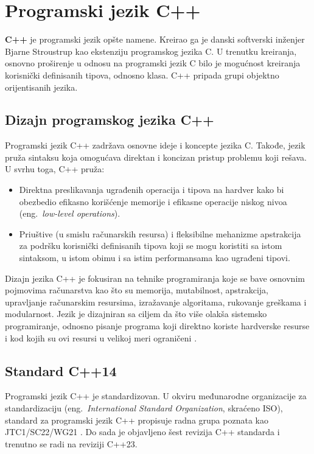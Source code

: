 \documentclass[12pt,oneside]{memoir}
\begin{document}
\section{Programski jezik C++}

\textbf{C++} je programski jezik op\v{s}te namene. Kreirao ga je danski softverski in\v{z}enjer Bjarne Stroustrup kao ekstenziju programskog jezika C. U trenutku kreiranja, osnovno pro\v{s}irenje u odnosu na programski jezik C bilo je mogu\'{c}nost kreiranja korisni\v{c}ki definisanih tipova, odnosno klasa. C++ pripada grupi objektno orijentisanih jezika. 

\subsection{Dizajn programskog jezika C++}

Programski jezik C++ zadr\v{z}ava osnovne ideje i koncepte jezika C. Takođe, jezik pru\v{z}a sintaksu koja omogu\'{c}ava direktan i koncizan pristup problemu koji re\v{s}ava.
U svrhu toga, C++ pru\v{z}a:
\begin{itemize}
  \item {Direktna preslikavanja ugrađenih operacija i tipova na hardver kako bi obezbedio efikasno kori\v{s}\'{c}enje memorije i efikasne operacije niskog nivoa (eng.~\textit{low-level operations}).}
  \item {Priu\v{s}tive (u smislu ra\v{c}unarskih resursa) i fleksibilne mehanizme apstrakcija za podr\v{s}ku korisni\v{c}ki definisanih tipova koji se mogu koristiti sa istom sintaksom, u istom obimu i sa istim performansama kao ugrađeni tipovi.}
\end{itemize}

Dizajn jezika C++ je fokusiran na tehnike programiranja koje se bave osnovnim pojmovima ra\v{c}unarstva kao \v{s}to su memorija, mutabilnost, apstrakcija, upravljanje ra\v{c}unarskim resursima, izra\v{z}avanje algoritama, rukovanje gre\v{s}kama i modularnost. Jezik je dizajniran sa ciljem da \v{s}to vi\v{s}e olak\v{s}a sistemsko programiranje, odnosno pisanje programa koji direktno koriste hardverske resurse i kod kojih su ovi resursi u velikoj meri ograni\v{c}eni \cite{TheC++ProgrammingLanguage}.


\subsection{Standard C++14}

Programski jezik C++ je standardizovan. U okviru međunarodne organizacije za standardizaciju (eng.~\textit{International Standard Organization}, skra\'{c}eno ISO), standard za programski jezik C++ propisuje radna grupa poznata kao JTC1/SC22/WG21 \cite{ISOWebsite}. Do sada je objavljeno \v{s}est revizija C++ standarda i trenutno se radi na reviziji C++23. 
\indent
\end{document}
